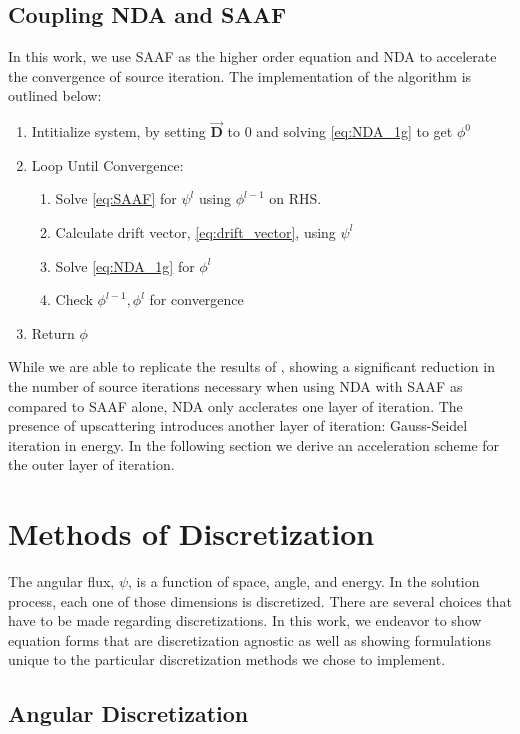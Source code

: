 \subsection{Coupling NDA and SAAF}
In this work, we use SAAF as the higher order equation and NDA to accelerate the convergence of source iteration. The implementation of the algorithm is outlined below:

\begin{enumerate}
    \item Intitialize system, by setting $\vec{\textbf{D}}$ to 0 and solving \eqref{eq:NDA_1g} to get $\phi^0$ 
    \item Loop Until Convergence:
        \begin{enumerate}
            \item Solve \eqref{eq:SAAF} for $\psi^l$ using $\phi^{l-1}$ on RHS.
            \item Calculate drift vector, \eqref{eq:drift_vector}, using $\psi^l$
            \item Solve \eqref{eq:NDA_1g} for $\phi^l$
            \item Check $\phi^{l-1}, \phi^l$ for convergence
        \end{enumerate}
    \item Return $\phi$
\end{enumerate}

While we are able to replicate the results of \cite{Wang2013}, showing a significant reduction in the number of source iterations necessary when using NDA with SAAF as compared to SAAF alone, NDA only acclerates one layer of iteration. The presence of upscattering introduces another layer of iteration: Gauss-Seidel iteration in energy. In the following section we derive an acceleration scheme for the outer layer of iteration.


\section{Methods of Discretization}
The angular flux, $\psi$, is a function of space, angle, and energy. In the solution process, each one of those dimensions is discretized. There are several choices that have to be made regarding discretizations. In this work, we endeavor to show equation forms that are discretization agnostic as well as showing formulations unique to the particular discretization methods we chose to implement. 

\subsection{Angular Discretization}

